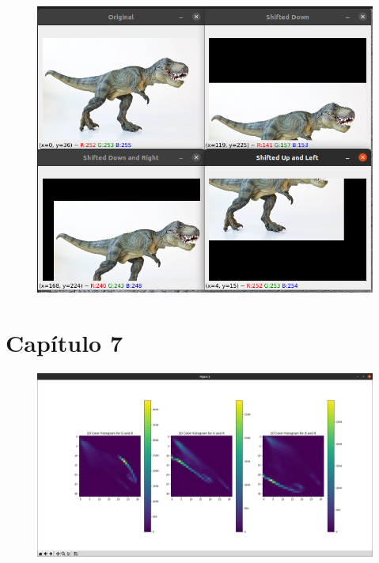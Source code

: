 \documentclass[12pt,letterpaper]{article}
\begin{document}
\begin{multicols}{2}
\begin{figure}[H]
\centering
\includegraphics[width = \columnwidth]{Resultado_ch6_11.png}
\end{figure}




\section{Capítulo 7}

\begin{figure}[H]
\centering
\includegraphics[width = \columnwidth]{Resultado1_ch7_1.png}
\end{figure} 


\end{multicols}
\end{document}
